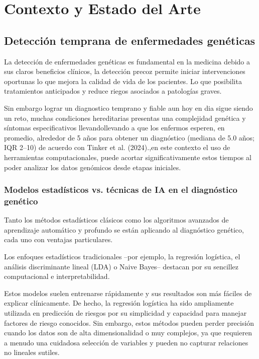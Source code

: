 \documentclass[11pt,a4paper,spanish]{book}
\numberwithin{equation}{chapter}
\numberwithin{figure}{chapter}
\begin{document}
\chapter{Contexto y Estado del Arte}
\section{Detección temprana de enfermedades genéticas}
La detección de enfermedades genéticas es fundamental en la medicina debido a sus claros beneficios clínicos, la detección precoz permite iniciar intervenciones oportunas lo que mejora la calidad de vida de los pacientes\cite{Ginsburg_2018}\cite{Lee2025-vx}. Lo que posibilita tratamientos anticipados y reduce riegos asociados a patologías graves.

Sin embargo lograr un diagnostico temprano y fiable aun hoy en dia sigue siendo un reto, muchas condiciones hereditarias presentas una complejidad genética y síntomas especificativos llevandollevando a que los enfermos esperen, en promedio, alrededor de 5 años para obtener un diagnóstico (mediana de 5.0 años; IQR 2–10) de acuerdo con Tinker et al. (2024).\cite{Tinker2024-xg},en este contexto el uso de herramientas computacionales, puede acortar significativamente estos tiempos al poder analizar los datos genómicos desde etapas iniciales.\cite{Alsentzer2025}

\subsection{Modelos estadísticos vs. técnicas de IA en el diagnóstico genético}

Tanto los métodos estadísticos clásicos como los algoritmos avanzados de aprendizaje automático y profundo se están aplicando al diagnóstico genético, cada uno con ventajas particulares\cite{Alharbi2022}.

Los enfoques estadísticos tradicionales –por ejemplo, la regresión logística, el análisis discriminante lineal (LDA) o Naive Bayes– destacan por su sencillez computacional e interpretabilidad\cite{Arshad2023}.

Estos modelos suelen entrenarse rápidamente y sus resultados son más fáciles de explicar clínicamente. De hecho, la regresión logística ha sido ampliamente utilizada en predicción de riesgos por su simplicidad y capacidad para manejar factores de riesgo conocidos. Sin embargo, estos métodos pueden perder precisión cuando los datos son de alta dimensionalidad o muy complejos, ya que requieren a menudo una cuidadosa selección de variables y pueden no capturar relaciones no lineales sutiles\cite{Salehi_2019}.
\end{document}
